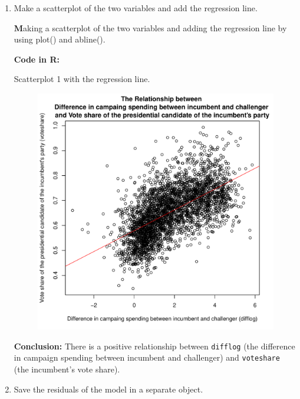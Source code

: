 \documentclass[12pt,letterpaper]{article}
\begin{document}
\begin{enumerate}
				\item Make a scatterplot of the two variables and add the regression line. 	\vspace{0.5cm}
		
		\noindent \textbf Making a scatterplot of the two variables and adding the regression line by using plot() and abline(). \vspace{0.5cm}
		
		\noindent \textbf{Code in R:}
		  
		\vspace{.25cm}
		
\begin{center}
			\noindent Scatterplot 1 with the regression line.
\end{center}
		
		\begin{figure}[h!]\centering

			\label{fig:plot_1}
			\includegraphics[width=.75\textwidth]{scatterplot_q1.pdf}
		\end{figure}
		
		\vspace{0.5cm}
		\noindent \textbf{Conclusion:} There is a positive relationship between \texttt{difflog} (the difference in campaign spending between incumbent and challenger) and \texttt{voteshare} (the incumbent's vote share).
		\vspace{0.5cm}
		
		\item Save the residuals of the model in a separate object.	\vspace{0.5cm}
		

\end{enumerate}
\end{document}
